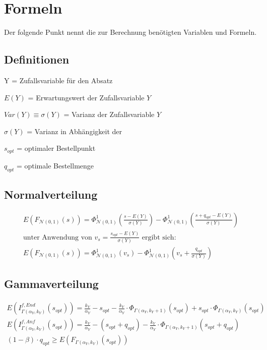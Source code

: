 \section{Formeln}
Der folgende Punkt nennt die zur Berechnung benötigten Variablen und Formeln.
\subsection{Definitionen}
Y = Zufallsvariable für den Absatz

\(E(Y)\) = Erwartungswert der Zufallsvariable $Y$

\(Var(Y) \equiv \sigma(Y)\) = Varianz der Zufallsvariable $Y$

\(\sigma(Y)\) = Varianz in Abhängigkeit der 

\(s_{opt}\) = optimaler Bestellpunkt

\(q_{opt}\) = optimale Bestellmenge
\subsection{Normalverteilung}
\begin{gather*}
E\left(F_{\mathcal{N}(0,1)}(s)\right)=\Phi^1_{\mathcal{N}(0,1)}\left(\frac{s-E(Y)}{\sigma(Y)}\right)-\Phi^1_{\mathcal{N}(0,1)}\left(\frac{s+q_{opt}-E(Y)}{\sigma(Y)}\right) \\
\text{unter Anwendung von } v_{s}=\frac{s_{opt}-E(Y)}{\sigma(Y)} \text{ ergibt sich:} \\
E\left(F_{\mathcal{N}(0,1)}(s)\right)=\Phi^1_{\mathcal{N}(0,1)}\left(v_{s}\right)-\Phi^1_{\mathcal{N}(0,1)}\left(v_s+\frac{q_{opt}}{\sigma(Y)}\right)
\end{gather*}
\subsection{Gammaverteilung}
\begin{gather*}
E\left(I^{f,End}_{\Gamma\left(\alpha_{Y},k_Y\right)}\left(s_{opt}\right)\right)=\frac{k_Y}{\alpha_Y}-s_{opt}-\frac{k_Y}{\alpha_Y}\cdot \Phi_{\Gamma\left(\alpha_Y,k_Y+1\right)}\left(s_{opt}\right)+s_{opt}\cdot \Phi_{\Gamma\left(\alpha_Y,k_Y\right)}\left(s_{opt}\right) \\
E\left(I^{f,Anf}_{\Gamma\left(\alpha_{Y},k_Y\right)}\left(s_{opt}\right)\right)=\frac{k_Y}{\alpha_Y}-\left(s_{opt}+q_{opt}\right)-\frac{k_Y}{\alpha_Y}\cdot \Phi_{\Gamma\left(\alpha_Y,k_Y+1\right)}\left(s_{opt}+q_{opt}\right) \\
\left(1-\beta\right)\cdot q_{opt}\geq E\left(F_{\Gamma\left(\alpha_{Y},k_{Y}\right)}\left(s_{opt}\right)\right)
\end{gather*}